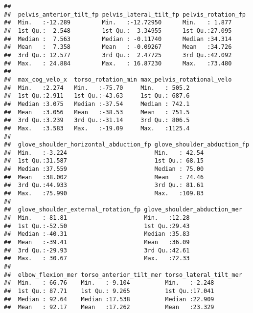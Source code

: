 \documentclass[
]{article}
\begin{document}
\begin{verbatim}
##                                                                
##  pelvis_anterior_tilt_fp pelvis_lateral_tilt_fp pelvis_rotation_fp
##  Min.   :-12.289         Min.   :-12.72950      Min.   : 1.877    
##  1st Qu.:  2.548         1st Qu.: -3.34955      1st Qu.:27.095    
##  Median :  7.563         Median : -0.11740      Median :34.314    
##  Mean   :  7.358         Mean   : -0.09267      Mean   :34.726    
##  3rd Qu.: 12.577         3rd Qu.:  2.47725      3rd Qu.:42.092    
##  Max.   : 24.884         Max.   : 16.87230      Max.   :73.480    
##                                                                   
##  max_cog_velo_x  torso_rotation_min max_pelvis_rotational_velo
##  Min.   :2.274   Min.   :-75.70     Min.   : 505.2            
##  1st Qu.:2.911   1st Qu.:-43.63     1st Qu.: 687.6            
##  Median :3.075   Median :-37.54     Median : 742.1            
##  Mean   :3.056   Mean   :-38.53     Mean   : 751.5            
##  3rd Qu.:3.239   3rd Qu.:-31.14     3rd Qu.: 806.5            
##  Max.   :3.583   Max.   :-19.09     Max.   :1125.4            
##                                                               
##  glove_shoulder_horizontal_abduction_fp glove_shoulder_abduction_fp
##  Min.   :-3.224                         Min.   : 42.54             
##  1st Qu.:31.587                         1st Qu.: 68.15             
##  Median :37.559                         Median : 75.00             
##  Mean   :38.002                         Mean   : 74.46             
##  3rd Qu.:44.933                         3rd Qu.: 81.61             
##  Max.   :75.990                         Max.   :109.83             
##                                                                    
##  glove_shoulder_external_rotation_fp glove_shoulder_abduction_mer
##  Min.   :-81.81                      Min.   :12.28               
##  1st Qu.:-52.50                      1st Qu.:29.43               
##  Median :-40.31                      Median :35.83               
##  Mean   :-39.41                      Mean   :36.09               
##  3rd Qu.:-29.93                      3rd Qu.:42.61               
##  Max.   : 30.67                      Max.   :72.33               
##                                                                  
##  elbow_flexion_mer torso_anterior_tilt_mer torso_lateral_tilt_mer
##  Min.   : 66.76    Min.   :-9.104          Min.   :-2.248        
##  1st Qu.: 87.71    1st Qu.: 9.265          1st Qu.:17.041        
##  Median : 92.64    Median :17.538          Median :22.909        
##  Mean   : 92.17    Mean   :17.262          Mean   :23.329        

\end{verbatim}
\end{document}
